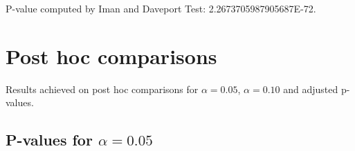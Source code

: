 \documentclass[a4paper,10pt]{article}
\begin{document}
\begin{landscape}
P-value computed by Iman and Daveport Test: 2.2673705987905687E-72.\newline



\pagebreak

\section{Post hoc comparisons}

Results achieved on post hoc comparisons for $\alpha = 0.05$, $\alpha = 0.10$ and adjusted p-values.

\subsection{P-values for $\alpha=0.05$}


\end{landscape}
\end{document}
